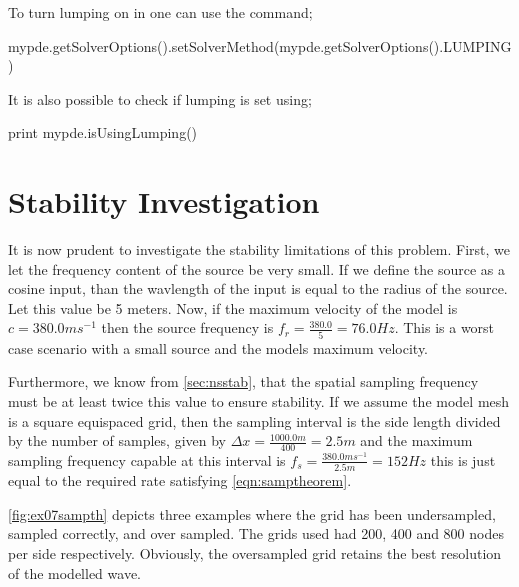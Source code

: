To turn lumping on in \esc one can use the command;
\begin{python}
 mypde.getSolverOptions().setSolverMethod(mypde.getSolverOptions().LUMPING)
\end{python}
It is also possible to check if lumping is set using;
\begin{python}
  print mypde.isUsingLumping()
\end{python}

\section{Stability Investigation}
It is now prudent to investigate the stability limitations of this problem.
First, we let the frequency content of the source be very small. If we define
the source as a cosine input, than the wavlength of the input is equal to the
radius of the source. Let this value be 5 meters. Now, if the maximum velocity
of the model is $c=380.0ms^{-1}$ then the source
frequency is $f_{r} = \frac{380.0}{5} = 76.0 Hz$. This is a worst case
scenario with a small source and the models maximum velocity. 

Furthermore, we know from \autoref{sec:nsstab}, that the spatial sampling
frequency must be at least twice this value to ensure stability. If we assume
the model mesh is a square equispaced grid,
then the sampling interval is the side length divided by the number of samples,
given by $\Delta x = \frac{1000.0m}{400} = 2.5m$ and the maximum sampling
frequency capable at this interval is
$f_{s}=\frac{380.0ms^{-1}}{2.5m}=152Hz$ this is just equal to the
required rate satisfying \autoref{eqn:samptheorem}. 

\autoref{fig:ex07sampth} depicts three examples where the grid has been
undersampled, sampled correctly, and over sampled. The grids used had
200, 400 and 800 nodes per side respectively. Obviously, the oversampled grid
retains the best resolution of the modelled wave.

